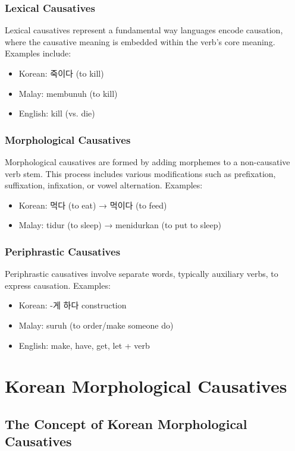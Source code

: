 \documentclass[12pt,a4paper]{article}
\begin{document}
\subsubsection{Lexical Causatives}

Lexical causatives represent a fundamental way languages encode causation, where the causative meaning is embedded within the verb's core meaning. Examples include:
\begin{itemize}
\item Korean: 죽이다 (to kill)
\item Malay: membunuh (to kill)
\item English: kill (vs. die)
\end{itemize}

\subsubsection{Morphological Causatives}

Morphological causatives are formed by adding morphemes to a non-causative verb stem. This process includes various modifications such as prefixation, suffixation, infixation, or vowel alternation. Examples:
\begin{itemize}
\item Korean: 먹다 (to eat) → 먹이다 (to feed)
\item Malay: tidur (to sleep) → menidurkan (to put to sleep)
\end{itemize}

\subsubsection{Periphrastic Causatives}

Periphrastic causatives involve separate words, typically auxiliary verbs, to express causation. Examples:
\begin{itemize}
\item Korean: -게 하다 construction
\item Malay: suruh (to order/make someone do)
\item English: make, have, get, let + verb
\end{itemize}

\section{Korean Morphological Causatives}

\subsection{The Concept of Korean Morphological Causatives}
\end{document}
